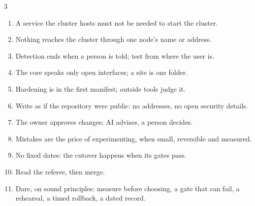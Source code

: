 \documentclass[11pt]{article}
\begin{document}
{\begin{multicols}{3}
\begin{enumerate}[leftmargin=*, itemsep=3pt, topsep=0pt]
\item A service the cluster hosts must not be needed to start the cluster.
\item Nothing reaches the cluster through one node's name or address.
\item Detection ends when a person is told; test from where the user is.
\item The core speaks only open interfaces; a site is one folder.
\item Hardening is in the first manifest; outside tools judge it.
\item Write as if the repository were public: no addresses, no open security details.
\item The owner approves changes; AI advises, a person decides.
\item Mistakes are the price of experimenting, when small, reversible and measured.
\item No fixed dates: the cutover happens when its gates pass.
\item Read the referee, then merge.
\item Dare, on sound principles: measure before choosing, a gate that can fail, a rehearsal, a timed rollback, a dated record.
\end{enumerate}
\end{multicols}}
\end{document}
